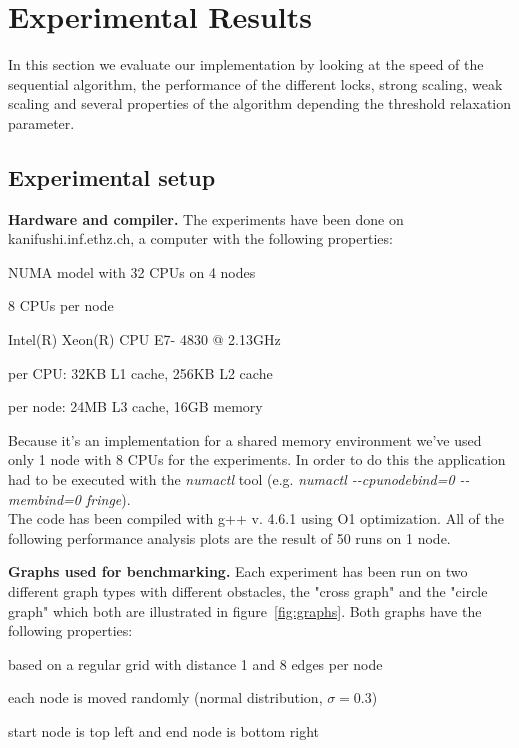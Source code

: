 \documentclass[letterpaper]{article}
\newcommand{\mypar}[1]{{\bf #1.}}
\begin{document}
\section{Experimental Results}\label{sec:exp}

In this section we evaluate our implementation by looking at the speed of the sequential algorithm, the performance of the different locks, strong scaling, weak scaling and several properties of the algorithm depending the threshold relaxation parameter.

\subsection{Experimental setup}\label{ssec:setup}

\mypar{Hardware and compiler}
The experiments have been done on kanifushi.inf.ethz.ch, a computer with the following properties:
\begin{compactitem}
\item NUMA model with 32 CPUs on 4 nodes
\item 8 CPUs per node
\item Intel(R) Xeon(R) CPU E7- 4830 @ 2.13GHz
\item per CPU: 32KB L1 cache, 256KB L2 cache
\item per node: 24MB L3 cache, 16GB memory
\end{compactitem}
Because it's an implementation for a shared memory environment we've used only 1 node with 8 CPUs for the experiments. In order to do this the application had to be executed with the \textit{numactl} tool (e.g. \textit{numactl -{}-cpunodebind=0 -{}-membind=0 fringe}).\\
The code has been compiled with g++ v. 4.6.1 using O1 optimization. All of the following performance analysis plots are the result of 50 runs on 1 node.

\mypar{Graphs used for benchmarking}
Each experiment has been run on two different graph types with different obstacles, the "cross graph" and the "circle graph" which both are illustrated in figure~\ref{fig:graphs}. Both graphs have the following properties:
\begin{compactitem}
\item based on a regular grid with distance 1 and 8 edges per node
\item each node is moved randomly (normal distribution, $\sigma = 0.3$)
\item start node is top left and end node is bottom right
\end{compactitem}
\end{document}
